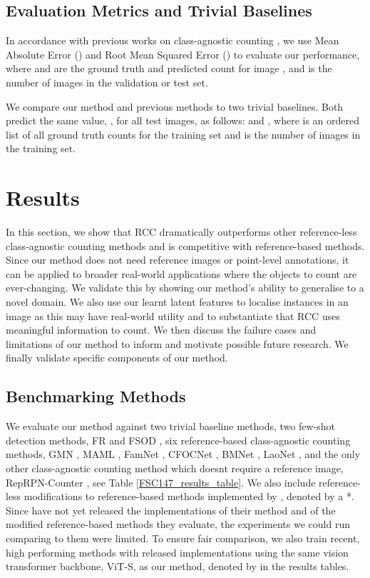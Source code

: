 \documentclass[letterpaper, 11pt]{IEEEtran}
\begin{document}
\subsection{Evaluation Metrics and Trivial Baselines}
\label{experiments_evaluationmetrics}
In accordance with previous works on class-agnostic counting \cite{shi2022represent, ranjan2022exemplar}, we use Mean Absolute Error () and Root Mean Squared Error () to evaluate our performance, 
where  and  are the ground truth and predicted count for image , and  is the number of images in the validation or test set.

We compare our method and previous methods to two trivial baselines. Both predict the same value, , for all test images, as follows:  and , 
where  is an ordered list of all ground truth counts for the training set and  is the number of images in the training set.
\section{Results}
In this section, we show that RCC dramatically outperforms other reference-less class-agnostic counting methods and is competitive with reference-based methods. Since our method does not need reference images or point-level annotations, it can be applied to broader real-world applications where the objects to count are ever-changing. We validate this by showing our method's ability to generalise to a novel domain. 
We also use our learnt latent features to localise instances in an image as this may have real-world utility and to substantiate that RCC uses meaningful information to count. We then discuss the failure cases and limitations of our method to inform and motivate possible future research. We finally validate specific components of our method.
\subsection{Benchmarking Methods}
We evaluate our method against two trivial baseline methods, two few-shot detection methods, FR \cite{kang2019few} and FSOD \cite{fan2020few},  six reference-based class-agnostic counting methods, GMN \cite{Lu18}, MAML \cite{finn2017model}, FamNet \cite{ranjan2021Famnet}, CFOCNet  \cite{yang2021cfoc}, BMNet \cite{shi2022represent}, LaoNet \cite{lin2021object}, and the only other  class-agnostic counting method which doesnt require a reference image, RepRPN-Counter \cite{ranjan2022exemplar}, see Table \ref{FSC147_results_table}. We also include reference-less modifications to reference-based methods implemented by \citet{ranjan2022exemplar}, denoted by a *. 
Since \citet{ranjan2022exemplar} have not yet released the implementations of their method and of the modified reference-based methods they evaluate, the experiments we could run comparing to them were limited.
To ensure fair comparison, we also train recent, high performing methods with released implementations using the same vision transformer backbone, ViT-S, as our method, denoted by  in the results tables.
\end{document}
